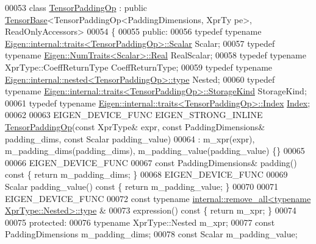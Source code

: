 \begin{DoxyCode}
00053 \textcolor{keyword}{class }\hyperlink{class_eigen_1_1_tensor_padding_op}{TensorPaddingOp} : \textcolor{keyword}{public} \hyperlink{class_eigen_1_1_tensor_base}{TensorBase}<TensorPaddingOp<PaddingDimensions, XprTy
      pe>, ReadOnlyAccessors>
00054 \{
00055   \textcolor{keyword}{public}:
00056   \textcolor{keyword}{typedef} \textcolor{keyword}{typename} \hyperlink{struct_eigen_1_1internal_1_1traits}{Eigen::internal::traits<TensorPaddingOp>::Scalar}
       Scalar;
00057   \textcolor{keyword}{typedef} \textcolor{keyword}{typename} \hyperlink{group___sparse_core___module}{Eigen::NumTraits<Scalar>::Real} RealScalar;
00058   \textcolor{keyword}{typedef} \textcolor{keyword}{typename} XprType::CoeffReturnType CoeffReturnType;
00059   \textcolor{keyword}{typedef} \textcolor{keyword}{typename} \hyperlink{class_eigen_1_1internal_1_1_tensor_lazy_evaluator_writable}{Eigen::internal::nested<TensorPaddingOp>::type}
       Nested;
00060   \textcolor{keyword}{typedef} \textcolor{keyword}{typename} \hyperlink{struct_eigen_1_1internal_1_1traits}{Eigen::internal::traits<TensorPaddingOp>::StorageKind}
       StorageKind;
00061   \textcolor{keyword}{typedef} \textcolor{keyword}{typename} \hyperlink{struct_eigen_1_1internal_1_1traits}{Eigen::internal::traits<TensorPaddingOp>::Index}
       \hyperlink{namespace_eigen_a62e77e0933482dafde8fe197d9a2cfde}{Index};
00062 
00063   EIGEN\_DEVICE\_FUNC EIGEN\_STRONG\_INLINE \hyperlink{class_eigen_1_1_tensor_padding_op}{TensorPaddingOp}(\textcolor{keyword}{const} XprType& expr, \textcolor{keyword}{const} 
      PaddingDimensions& padding\_dims, \textcolor{keyword}{const} Scalar padding\_value)
00064       : m\_xpr(expr), m\_padding\_dims(padding\_dims), m\_padding\_value(padding\_value) \{\}
00065 
00066     EIGEN\_DEVICE\_FUNC
00067     \textcolor{keyword}{const} PaddingDimensions& padding()\textcolor{keyword}{ const }\{ \textcolor{keywordflow}{return} m\_padding\_dims; \}
00068     EIGEN\_DEVICE\_FUNC
00069     Scalar padding\_value()\textcolor{keyword}{ const }\{ \textcolor{keywordflow}{return} m\_padding\_value; \}
00070 
00071     EIGEN\_DEVICE\_FUNC
00072     \textcolor{keyword}{const} \textcolor{keyword}{typename} \hyperlink{group___sparse_core___module}{internal::remove\_all<typename XprType::Nested>::type}
      &
00073     expression()\textcolor{keyword}{ const }\{ \textcolor{keywordflow}{return} m\_xpr; \}
00074 
00075   \textcolor{keyword}{protected}:
00076     \textcolor{keyword}{typename} XprType::Nested m\_xpr;
00077     \textcolor{keyword}{const} PaddingDimensions m\_padding\_dims;
00078     \textcolor{keyword}{const} Scalar m\_padding\_value;

\end{DoxyCode}
